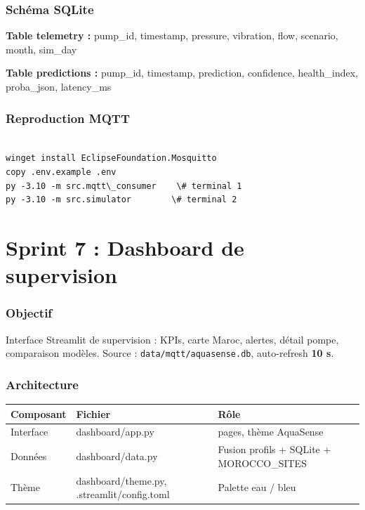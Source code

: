 \documentclass[11pt,a4paper]{report}
\begin{document}
\subsection{Schéma SQLite}

\textbf{Table telemetry :} pump\_id, timestamp, pressure, vibration, flow, scenario, month, sim\_day

\textbf{Table predictions :} pump\_id, timestamp, prediction, confidence, health\_index, proba\_json, latency\_ms

\subsection{Reproduction MQTT}

\begin{lstlisting}

winget install EclipseFoundation.Mosquitto
copy .env.example .env
py -3.10 -m src.mqtt\_consumer    \# terminal 1
py -3.10 -m src.simulator        \# terminal 2

\end{lstlisting}

\clearpage

\chapter[Sprint 7]{Sprint 7 : Dashboard de supervision}

\label{ch:sprint7}

\subsection{Objectif}

Interface Streamlit de supervision : KPIs, carte Maroc, alertes, détail pompe, comparaison modèles. Source : \texttt{data/mqtt/aquasense.db}, auto-refresh \textbf{10 s}.

\subsection{Architecture}

{\small
\begin{longtable}{@{}>{\raggedright\arraybackslash}p{}>{\raggedright\arraybackslash}p{}>{\raggedright\arraybackslash}p{}@{}}
\toprule
\rowcolor{EHTPTableHead}Composant & Fichier & Rôle \\
\midrule
Interface & dashboard/app.py & 5 pages, thème AquaSense \\
Données & dashboard/data.py & Fusion profils + SQLite + MOROCCO\_SITES \\
Thème & dashboard/theme.py, .streamlit/config.toml & Palette eau / bleu \\
\bottomrule
\end{longtable}
}
\end{document}
